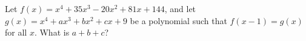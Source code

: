 Let $f(x)=x^4+35x^3-20x^2+81x+144$, and let $g(x)=x^4+ax^3+bx^2+cx+9$ be a polynomial such that $f(x-1)=g(x)$ for all $x$. What is $a+b+c$?
